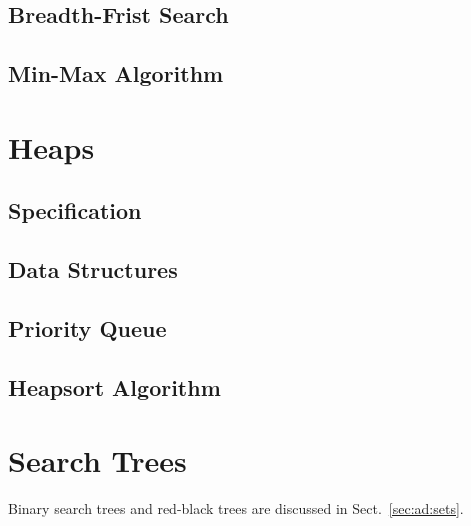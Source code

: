 \subsection{Breadth-Frist Search}

\subsection{Min-Max Algorithm}

\section{Heaps}\label{sec:ad:heaps}

\subsection{Specification}

\subsection{Data Structures}

\subsection{Priority Queue}\label{sec:ad:heapqueue}

\subsection{Heapsort Algorithm}\label{sec:ad:heapsort}

\section{Search Trees}

Binary search trees and red-black trees are discussed in Sect.~\ref{sec:ad:sets}.